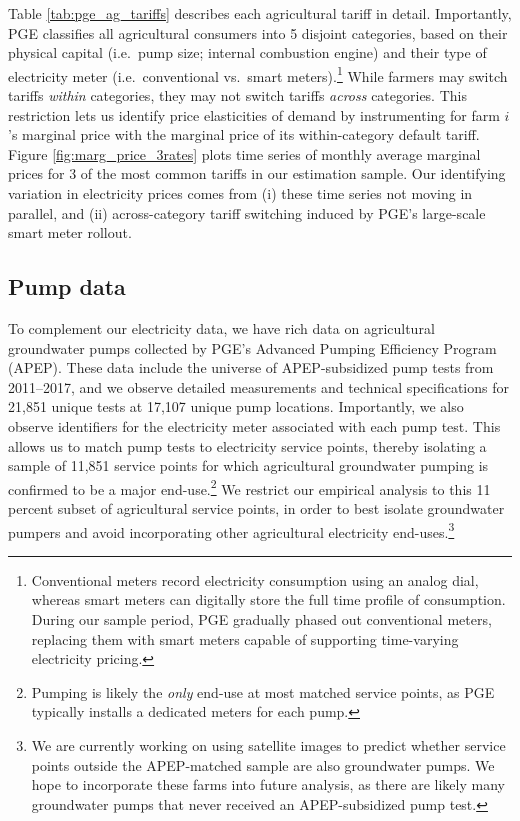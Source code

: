 Table \ref{tab:pge_ag_tariffs} describes each agricultural tariff in detail. Importantly, PGE classifies all agricultural consumers into 5 disjoint categories, based on their physical capital (i.e.\ pump size; internal combustion engine) and their type of electricity meter (i.e.\ conventional vs.\ smart meters).\footnote{ 
Conventional meters record electricity consumption using an analog dial, whereas smart meters can digitally store the full time profile of consumption. During our sample period, PGE gradually phased out conventional meters, replacing them with smart meters capable of supporting time-varying electricity pricing. 
}
While farmers may switch tariffs \emph{within} categories, they may not switch tariffs \emph{across} categories. This restriction lets us identify price elasticities of demand by instrumenting for farm $i$'s marginal price with the marginal price of its within-category default tariff. Figure \ref{fig:marg_price_3rates} plots time series of monthly average marginal prices for 3 of the most common tariffs in our estimation sample. Our identifying variation in electricity prices comes from (i) these time series not moving in parallel, and (ii) across-category tariff switching induced by PGE's large-scale smart meter rollout.

\subsection{Pump data}

To complement our electricity data, we have rich data on agricultural groundwater pumps collected by PGE's Advanced Pumping Efficiency Program (APEP). These data include the universe of APEP-subsidized pump tests from 2011--2017, and we observe detailed measurements and technical specifications for 21,851 unique tests at 17,107 unique pump locations. Importantly, we also observe identifiers for the electricity meter associated with each pump test. This allows us to match pump tests to electricity service points, thereby isolating a sample of 11,851 service points for which agricultural groundwater pumping is confirmed to be a major end-use.\footnote{
Pumping is likely the \emph{only} end-use at most matched service points, as PGE typically installs a dedicated meters for each pump.
}
We restrict our empirical analysis to this 11 percent subset of agricultural service points, in order to best isolate groundwater pumpers and avoid incorporating other agricultural electricity end-uses.\footnote{
We are currently working on using satellite images to predict whether service points outside the APEP-matched sample are also groundwater pumps. We hope to incorporate these farms into future analysis, as there are likely many groundwater pumps that never received an APEP-subsidized pump test.
}

